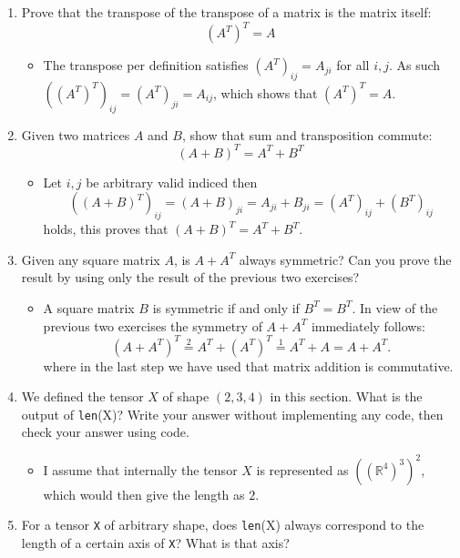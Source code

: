 \documentclass{article}
\begin{document}
\begin{enumerate}
    \item Prove that the transpose of the transpose of a matrix is the matrix itself: \\
    $$(A^T)^T = A$$
    	\begin{itemize}
    		\item The transpose per definition satisfies $(A^T)_{ij} = A_{ji}$ for all $i, j$. As such $((A^T)^T)_{ij} = (A^T)_{ji} = A_{ij}$, which shows that $(A^T)^T = A$.
    	\end{itemize}

    \item Given two matrices $A$ and $B$, show that sum and transposition commute: \\
    $$(A + B)^T = A^T + B^T$$
    	\begin{itemize}
    		\item Let $i, j$ be arbitrary valid indiced then
    		$$((A + B)^T)_{ij} = (A + B)_{ji} = A_{ji} + B_{ji} = (A^T)_{ij} + (B^T)_{ij}$$
    		holds, this proves that $(A + B)^T = A^T + B^T$.
    	\end{itemize}

    \item Given any square matrix $A$, is $A + A^T$ always symmetric? Can you prove the result by using only the result of the previous two exercises?
    	\begin{itemize}
    		\item A square matrix $B$ is symmetric if and only if $B^T = B^T$. In view of the previous two exercises the symmetry of $A + A^T$ immediately follows:
    		$$
    		(A + A^T)^T \overset{2}{=} A^T + (A^T)^T \overset{1}{=} A^T + A = A + A^T.
    		$$ 
    		where in the last step we have used that matrix addition is commutative.
    	\end{itemize}

    \item We defined the tensor $X$ of shape $(2, 3, 4)$ in this section. What is the output of \texttt{len}(X)? Write your answer without implementing any code, then check your answer using code.
    	\begin{itemize}
    		\item I assume that internally the tensor $X$ is represented as $((\mathbb{R}^4)^3)^2$, which would then give the length as $2$.
    	\end{itemize}

    \item For a tensor \texttt{X} of arbitrary shape, does \texttt{len}(X) always correspond to the length of a certain axis of \texttt{X}? What is that axis?


\end{enumerate}
\end{document}
